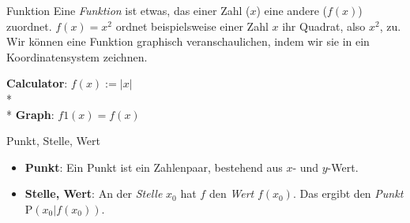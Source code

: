 \begin{bla}{Funktion}
  Eine \emph{Funktion} ist etwas, das einer Zahl ($x$) eine andere ($f(x)$) zuordnet. $f(x)=x^2$ ordnet beispielsweise einer Zahl $x$ ihr Quadrat, also $x^2$, zu. \\
  Wir können eine Funktion graphisch veranschaulichen, indem wir sie in ein Koordinatensystem zeichnen.

  \begin{marginfigure}
    \caption{Graph von $f(x)=x^2$. Für einen $x$-Wert von der $x$-Achse (hier $x_0$) kann sein zugehöriger $f(x)$-Wert (hier $f(x_0)$) abgelesen werden.}
  \end{marginfigure}
  \begin{marginfigure}
    \begin{tcolorbox}[colback=white!95!black,colframe=white!75!black,title=CAS:,arc=0mm]
      \begin{scriptsize}
        \textbf{Calculator}: \hfill \( f(x) := |x| \) \\* \ \\*
        \textbf{Graph}: \hfill \( f1(x) = f(x) \)
      \end{scriptsize}
    \end{tcolorbox}
  \end{marginfigure}
\end{bla}

\begin{bla}{Punkt, Stelle, Wert}
  \begin{itemize}
    \item \textbf{Punkt}: Ein Punkt ist ein Zahlenpaar, bestehend aus $x$- und $y$-Wert.
    \item \textbf{Stelle, Wert}: An der \emph{Stelle} $x_0$ hat $f$ den \emph{Wert} $f(x_0)$. Das ergibt den \emph{Punkt} $\mathrm{P}(x_0|f(x_0))$.
  \end{itemize}
\end{bla}

